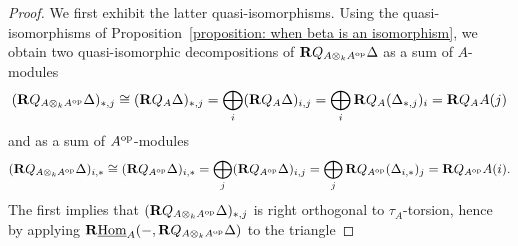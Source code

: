 \begin{proof}
  We first exhibit the latter quasi-isomorphisms.  
  Using the quasi-isomorphisms of Proposition~\ref{proposition: when beta is an isomorphism}, we obtain two quasi-isomorphic decompositions of \(\mathbf{R}Q_{A \otimes_k A^{\operatorname{op}}} \Delta\) as a sum of \(A\)-modules
  \[(\mathbf{R}Q_{A \otimes_k A^{\operatorname{op}}} \Delta)_{\ast,j} \cong (\mathbf{R}Q_{A} \Delta)_{\ast,j} = \bigoplus_i (\mathbf{R}Q_{A} \Delta)_{i,j} = \bigoplus_i \mathbf{R}Q_A(\Delta_{\ast,j})_i = \mathbf{R}Q_A A(j)\]
  and as a sum of \(A^{\operatorname{op}}\)-modules
  \[(\mathbf{R}Q_{A \otimes_k A^{\operatorname{op}}} \Delta)_{i,\ast} \cong (\mathbf{R}Q_{A^{\operatorname{op}}} \Delta)_{i,\ast} = \bigoplus_j (\mathbf{R}Q_{A^{\operatorname{op}}} \Delta)_{i,j} = \bigoplus_j \mathbf{R}Q_{A^{\operatorname{op}}}(\Delta_{i,\ast})_j = \mathbf{R}Q_{A^{\operatorname{op}}} A(i).\]
  The first implies that \((\mathbf{R}Q_{A \otimes_k A^{\operatorname{op}}} \Delta)_{\ast,j}\) is right orthogonal to \(\tau_A\)-torsion, hence by applying \(\mathbf{R}\underline{\operatorname{Hom}}_A(-, \mathbf{R}Q_{A \otimes_k A^{\operatorname{op}}} \Delta)\) to the triangle

\end{proof}
